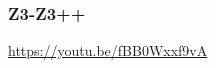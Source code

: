 \documentclass[table]{beamer}
\begin{document}
\newcommand{\myvideopdf}[2]{
\begin{frame}
  \frametitle{#1}
  \begin{center}
    video: \texttt{#2}
  \end{center}
\end{frame}
}

















\begin{frame}
  \frametitle{Z3-Z3++}

  \begin{center}
    \url{https://youtu.be/fBB0Wxxf9vA}
  \end{center}
\end{frame}
\end{document}
